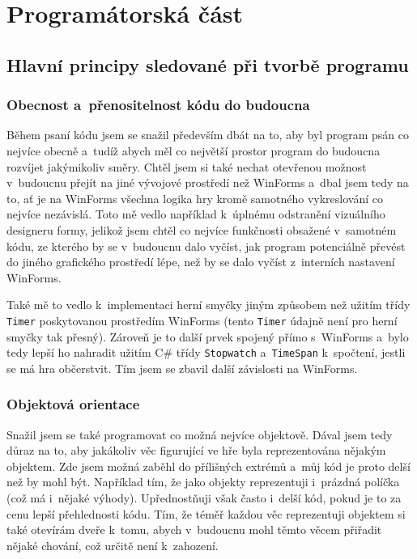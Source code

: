 \documentclass{article}
\begin{document}
\section{Programátorská část}
\subsection{Hlavní principy sledované při tvorbě programu}

\subsubsection{Obecnost a~přenositelnost kódu do budoucna}
Během psaní kódu jsem se snažil především dbát na to, aby byl program psán co nejvíce obecně a~tudíž abych měl co největší prostor program do budoucna rozvíjet jakýmikoliv směry. Chtěl jsem si také nechat otevřenou možnost v~budoucnu přejít na jiné vývojové prostředí než WinForms a~dbal jsem tedy na to, ať je na WinForms všechna logika hry kromě samotného vykreslování co nejvíce nezávislá. Toto mě vedlo například k~úplnému odstranění vizuálního designeru formy, jelikož jsem chtěl co nejvíce funkčnosti obsažené v~samotném kódu, ze kterého by se v~budoucnu dalo vyčíst, jak program potenciálně převést do jiného grafického prostředí lépe, než by se dalo vyčíst z~interních nastavení WinForms.

Také mě to vedlo k~implementaci herní smyčky jiným způsobem než užitím třídy \verb|Timer| poskytovanou prostředím WinForms (tento \verb|Timer| údajně není pro herní smyčky tak přesný). Zároveň je to další prvek spojený přímo s~WinForms a~bylo tedy lepší ho nahradit užitím C\# třídy \verb|Stopwatch| a~\verb|TimeSpan| k~spočtení, jestli se má hra občerstvit. Tím jsem se zbavil další závislosti na WinForms.

\subsubsection{Objektová orientace}
Snažil jsem se také programovat co možná nejvíce objektově. Dával jsem tedy důraz na to, aby jakákoliv věc figurující ve hře byla reprezentována nějakým objektem. Zde jsem možná zaběhl do přílišných extrémů a~můj kód je proto delší než by mohl být. Například tím, že jako objekty reprezentuji i~prázdná políčka (což má i~nějaké výhody). Upřednostňuji však často i~delší kód, pokud je to za cenu lepší přehlednosti kódu. Tím, že téměř každou věc reprezentuji objektem si také otevírám dveře k~tomu, abych v~budoucnu mohl těmto věcem přiřadit nějaké chování, což určitě není k~zahození.
\end{document}
